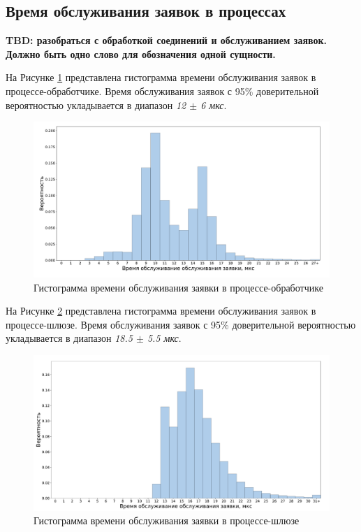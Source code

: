\subsection{Время обслуживания заявок в процессах}
\textbf{TBD: разобраться с обработкой соединений и обслуживанием заявок. Должно быть одно слово для обозначения одной сущности.}

На Рисунке \ref{chapter41:EngineLatency} представлена гистограмма времени обслуживания заявок в процессе-обработчике. Время обслуживания заявок с 95\% доверительной вероятностью укладывается в диапазон \textit{12 $\pm$ 6 мкс}.
\begin{figure}[!h]
\caption{Гистограмма времени обслуживания заявки в процессе-обработчике}
\label{chapter41:EngineLatency}
\includegraphics[width=\textwidth]{../../graphics/hist/Engine}
\end{figure}

На Рисунке \ref{chapter41:TRLatency} представлена гистограмма времени обслуживания заявок в процессе-шлюзе. Время обслуживания заявок с 95\% доверительной вероятностью укладывается в диапазон \textit{18.5 $\pm$ 5.5 мкс}.
\begin{figure}[!h]
\caption{Гистограмма времени обслуживания заявки в процессе-шлюзе}
\label{chapter41:TRLatency}
\includegraphics[width=\textwidth]{../../graphics/hist/TR}
\end{figure}


